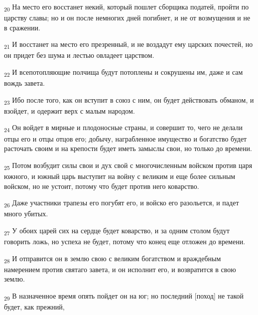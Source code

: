 \begin{tcolorbox}
\textsubscript{20} На место его восстанет некий, который пошлет сборщика податей, пройти по царству славы; но и он после немногих дней погибнет, и не от возмущения и не в сражении.
\end{tcolorbox}
\begin{tcolorbox}
\textsubscript{21} И восстанет на место его презренный, и не воздадут ему царских почестей, но он придет без шума и лестью овладеет царством.
\end{tcolorbox}
\begin{tcolorbox}
\textsubscript{22} И всепотопляющие полчища будут потоплены и сокрушены им, даже и сам вождь завета.
\end{tcolorbox}
\begin{tcolorbox}
\textsubscript{23} Ибо после того, как он вступит в союз с ним, он будет действовать обманом, и взойдет, и одержит верх с малым народом.
\end{tcolorbox}
\begin{tcolorbox}
\textsubscript{24} Он войдет в мирные и плодоносные страны, и совершит то, чего не делали отцы его и отцы отцов его; добычу, награбленное имущество и богатство будет расточать своим и на крепости будет иметь замыслы свои, но только до времени.
\end{tcolorbox}
\begin{tcolorbox}
\textsubscript{25} Потом возбудит силы свои и дух свой с многочисленным войском против царя южного, и южный царь выступит на войну с великим и еще более сильным войском, но не устоит, потому что будет против него коварство.
\end{tcolorbox}
\begin{tcolorbox}
\textsubscript{26} Даже участники трапезы его погубят его, и войско его разольется, и падет много убитых.
\end{tcolorbox}
\begin{tcolorbox}
\textsubscript{27} У обоих царей сих на сердце будет коварство, и за одним столом будут говорить ложь, но успеха не будет, потому что конец еще отложен до времени.
\end{tcolorbox}
\begin{tcolorbox}
\textsubscript{28} И отправится он в землю свою с великим богатством и враждебным намерением против святаго завета, и он исполнит его, и возвратится в свою землю.
\end{tcolorbox}
\begin{tcolorbox}
\textsubscript{29} В назначенное время опять пойдет он на юг; но последний [поход] не такой будет, как прежний,
\end{tcolorbox}
